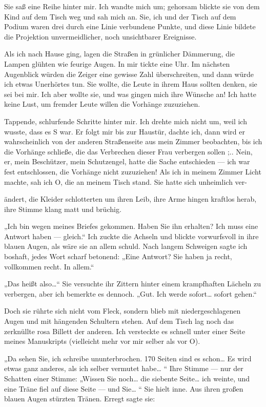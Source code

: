 Sie saß eine Reihe hinter mir. Ich wandte mich um; gehorsam blickte
sie von dem Kind auf dem Tisch weg und sah mich an. Sie, ich und
der Tisch auf dem Podium waren drei durch eine Linie verbundene
Punkte, und diese Linie bildete die Projektion unvermeidlicher,
noch unsichtbarer Ereignisse.

Als ich nach Hause ging, lagen die Straßen in grünlicher Dämmerung,
die Lampen glühten wie feurige Augen. In mir tickte eine Uhr. Im
nächsten Augenblick würden die Zeiger eine gewisse Zahl
überschreiten, und dann würde ich etwas Unerhörtes tun. Sie wollte,
die Leute in ihrem Haus sollten denken, sie sei bei mir. Ich aber
wollte sie, und was gingen mich ihre Wünsche an! Ich hatte keine
Lust, um fremder Leute willen die Vorhänge zuzuziehen.

Tappende, schlurfende Schritte hinter mir. Ich drehte mich nicht
um, weil ich wusste, dass es S war. Er folgt mir bis zur Haustür,
dachte ich, dann wird er wahrscheinlich von der anderen
Straßenseite aus mein Zimmer beobachten, bis ich die Vorhänge
schließe, die das Verbrechen dieser Frau verbergen sollen ;.. Nein,
er, mein Beschützer, mein Schutzengel, hatte die Sache entschieden
— ich war fest entschlossen, die Vorhänge nicht zuzuziehen! Als ich
in meinem Zimmer Licht machte, sah ich O, die an meinem Tisch
stand. Sie hatte sich unheimlich ver-

ändert, die Kleider schlotterten um ihren Leib, ihre Arme hingen
kraftlos herab, ihre Stimme klang matt und brüchig.

„Ich bin wegen meines Briefes gekommen. Haben Sie ihn erhalten? Ich
muss eine Antwort haben — gleich.“ Ich zuckte die Achseln und
blickte vorwurfsvoll in ihre blauen Augen, als wäre sie an allem
schuld. Nach langem Schweigen sagte ich boshaft, jedes Wort scharf
betonend: „Eine Antwort? Sie haben ja recht, vollkommen recht. In
allem.“

„Das heißt also\ldots{}“ Sie versuchte ihr Zittern hinter einem
krampfhaften Lächeln zu verbergen, aber ich bemerkte es dennoch.
„Gut. Ich werde sofort\ldots{} sofort gehen.“

Doch sie rührte sich nicht vom Fleck, sondern blieb mit
niedergeschlagenen Augen und mit hängenden Schultern stehen. Auf
dem Tisch lag noch das zerknüllte rosa Billett der anderen. Ich
versteckte es schnell unter einer Seite meines Manuskripts
(vielleicht mehr vor mir selber als vor O).

„Da sehen Sie, ich schreibe ununterbrochen. 170 Seiten sind es
schon\ldots{} Es wird etwas ganz anderes, als ich selber vermutet
habe\ldots{} “ Ihre Stimme — nur der Schatten einer Stimme: „Wissen Sie
noch\ldots{} die siebente Seite\ldots{} ich weinte, und eine Träne fiel auf
diese Seite — und Sie\ldots{} “ Sie hielt inne. Aus ihren großen blauen
Augen stürzten Tränen. Erregt sagte sie:


